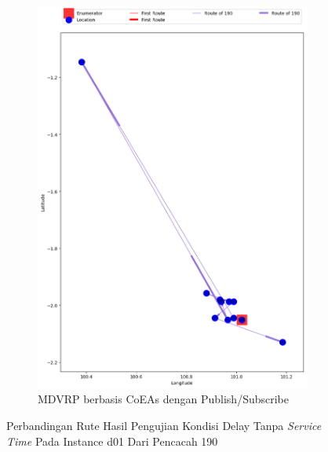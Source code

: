\begin{figure}[H]\ContinuedFloat
	\centering
	\begin{subfigure}[t]{\textwidth}
		\centering
		\includegraphics[width=\textwidth]{Resources/Images/delayed_1/real_m15_n100_delayed_1_190_pubsub_coes}
		\caption{MDVRP berbasis CoEAs dengan Publish/Subscribe}
		\label{fig:real_m15_n100_delayed_1_190_pubsub_coes}
	\end{subfigure}
	\caption{Perbandingan Rute Hasil Pengujian Kondisi Delay Tanpa \textit{Service Time} Pada Instance d01 Dari Pencacah 190}
	\label{fig:real_m15_n100_delayed_1_190_contd}
\end{figure}


